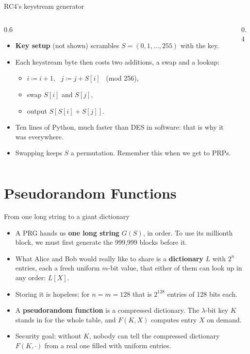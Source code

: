 \ifdefined\PRESENTATION\else\PassOptionsToClass{handout}{beamer}\fi\documentclass[aspectratio=169, lualatex]{beamer}
\begin{document}
\begin{frame}{RC4's keystream generator}
	\begin{columns}[c]
		\begin{column}{0.6\textwidth}
			\begin{itemize}
				\item \textbf{Key setup} (not shown) scrambles $S = (0, 1, \ldots, 255)$ with the key.
				\item Each keystream byte then costs two additions, a swap and a lookup:
				      \begin{itemize}
					      \item $i \coloneq i + 1$, \ $j \coloneq j + S[i]$ \ (mod 256),
					      \item swap $S[i]$ and $S[j]$,
					      \item output $S[S[i] + S[j]]$.
				      \end{itemize}
				\item Ten lines of Python, much faster than DES in software: that is why it was everywhere.
				\item Swapping keeps $S$ a permutation. Remember this when we get to PRPs.
			\end{itemize}
		\end{column}
		\begin{column}{0.4\textwidth}
		\end{column}
	\end{columns}
\end{frame}

\section{Pseudorandom Functions}

\begin{frame}{From one long string to a giant dictionary}
	\begin{itemize}
		\item A PRG hands us \textbf{one long string} $G(S)$, in order. To use its millionth block, we must first generate the 999,999 blocks before it.
		\item What Alice and Bob would really like to share is a \textbf{dictionary} $L$ with $2^n$ entries, each a fresh uniform $m$-bit value, that either of them can look up in any order: $L[X]$.
		\item Storing it is hopeless: for $n = m = 128$ that is $2^{128}$ entries of 128 bits each.
		\item A \textbf{pseudorandom function} is a compressed dictionary. The $\lambda$-bit key $K$ stands in for the whole table, and $F(K, X)$ computes entry $X$ on demand.
		\item Security goal: without $K$, nobody can tell the compressed dictionary $F(K, \cdot)$ from a real one filled with uniform entries.
	\end{itemize}
\end{frame}
\end{document}
